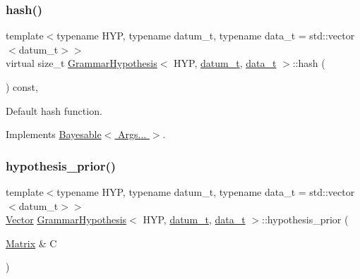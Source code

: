 \mbox{\label{class_grammar_hypothesis_a55297e7d1dac48158efa012445b93137}} 
\subsubsection{\texorpdfstring{hash()}{hash()}}
{\footnotesize\ttfamily template$<$typename H\+YP, typename datum\+\_\+t, typename data\+\_\+t = std\+::vector$<$datum\+\_\+t$>$$>$ \\
virtual size\+\_\+t \hyperlink{class_grammar_hypothesis}{Grammar\+Hypothesis}$<$ H\+YP, \hyperlink{class_bayesable_a9f1a6c0cd7855550fa10b1a8f13a5867}{datum\+\_\+t}, \hyperlink{class_bayesable_aa2788c4d7718c0a824e1d28c4c98f921}{data\+\_\+t} $>$\+::hash (\begin{DoxyParamCaption}{ }\end{DoxyParamCaption}) const\hspace{0.3cm}{\ttfamily [inline]}, {\ttfamily [virtual]}}



Default hash function. 



Implements \hyperlink{class_bayesable_a26f6d55e7526ebd897cbb27c757b611b}{Bayesable$<$ Args... $>$}.

\mbox{\label{class_grammar_hypothesis_aaa7c2208808f4a1e7995c872e5c75028}} 
\subsubsection{\texorpdfstring{hypothesis\+\_\+prior()}{hypothesis\_prior()}}
{\footnotesize\ttfamily template$<$typename H\+YP, typename datum\+\_\+t, typename data\+\_\+t = std\+::vector$<$datum\+\_\+t$>$$>$ \\
\hyperlink{_eigen_numerics_8h_aca2956bc379bce2ed88ab3c0e1b61d1d}{Vector} \hyperlink{class_grammar_hypothesis}{Grammar\+Hypothesis}$<$ H\+YP, \hyperlink{class_bayesable_a9f1a6c0cd7855550fa10b1a8f13a5867}{datum\+\_\+t}, \hyperlink{class_bayesable_aa2788c4d7718c0a824e1d28c4c98f921}{data\+\_\+t} $>$\+::hypothesis\+\_\+prior (\begin{DoxyParamCaption}\item[{\hyperlink{_eigen_numerics_8h_a645222978e81acfb2523a9bce34aecc0}{Matrix} \&}]{C }\end{DoxyParamCaption})\hspace{0.3cm}{\ttfamily [inline]}}

